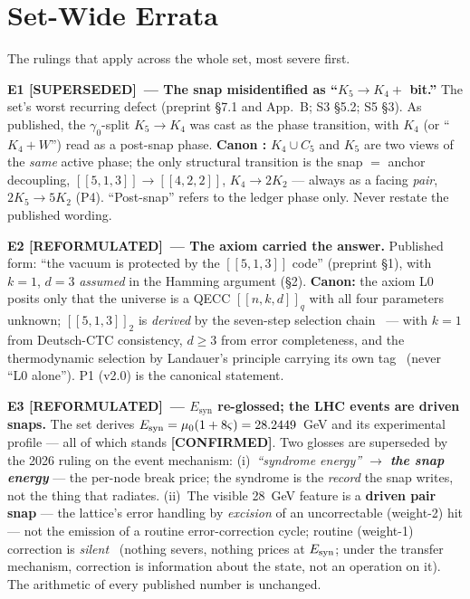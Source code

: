 \documentclass[11pt,a4paper]{article}
\newcommand{\SUP}{\textcolor{Ecolor}{\textbf{[SUPERSEDED]}}}     %
\newcommand{\REF}{\textcolor{Icolor}{\textbf{[REFORMULATED]}}}   %
\newcommand{\OK}{\textcolor{Rcolor}{\textbf{[CONFIRMED]}}}       %
\begin{document}
\newpage

\section{Set-Wide Errata}

The rulings that apply across the whole set, most severe first.

\begin{mdframed}[backgroundcolor=Ebg,linecolor=Ecolor,linewidth=1.2pt]
\textbf{E1 \SUP\ --- The snap misidentified as ``$K_5 \to K_4 + $ bit.''} The set's worst recurring defect (preprint \S7.1 and App.~B; S3 \S5.2; S5 \S3). As published, the $\gamma_0$-split $K_5 \to K_4$ was cast as the phase transition, with $K_4$ (or ``$K_4 + W$'') read as a post-snap phase. \textbf{Canon \Rmark:} $K_4\cup C_5$ and $K_5$ are two views of the \emph{same} active phase; the only structural transition is the snap $=$ anchor decoupling, $[\![5,1,3]\!] \to [\![4,2,2]\!]$, $K_4 \to 2K_2$ --- always as a facing \emph{pair}, $2K_5 \to 5K_2$ (P4). ``Post-snap'' refers to the ledger phase only. Never restate the published wording.
\end{mdframed}

\begin{mdframed}[backgroundcolor=Ibg,linecolor=Icolor,linewidth=1.2pt]
\textbf{E2 \REF\ --- The axiom carried the answer.} Published form: ``the vacuum is protected by the $[\![5,1,3]\!]$ code'' (preprint \S1), with $k{=}1$, $d{=}3$ \emph{assumed} in the Hamming argument (\S2). \textbf{Canon:} the axiom L0 posits only that the universe is a QECC $[\![n,k,d]\!]_q$ with all four parameters unknown; $[\![5,1,3]\!]_2$ is \emph{derived} by the seven-step selection chain \Rmark\ --- with $k{=}1$ from Deutsch-CTC consistency, $d\ge3$ from error completeness, and the thermodynamic selection by Landauer's principle carrying its own tag \Tmark\ (never ``L0 alone''). P1 (v2.0) is the canonical statement.
\end{mdframed}

\begin{mdframed}[backgroundcolor=Ibg,linecolor=Icolor,linewidth=1.2pt]
\textbf{E3 \REF\ --- $E_{\mathrm{syn}}$ re-glossed; the LHC events are driven snaps.} The set derives $E_{\mathrm{syn}} = \mu_0(1+8\varsigma) = 28.2449$~GeV and its experimental profile --- all of which stands \OK. Two glosses are superseded by the 2026 ruling on the event mechanism: (i)~\emph{``syndrome energy'' $\to$ \textbf{the snap energy}} --- the per-node break price; the syndrome is the \emph{record} the snap writes, not the thing that radiates. (ii)~The visible 28~GeV feature is a \textbf{driven pair snap} --- the lattice's error handling by \emph{excision} of an uncorrectable (weight-2) hit --- not the emission of a routine error-correction cycle; routine (weight-1) correction is \emph{silent} \Rmark\ (nothing severs, nothing prices at $E_{\mathrm{syn}}$; under the transfer mechanism, correction is information about the state, not an operation on it). The arithmetic of every published number is unchanged.
\end{mdframed}
\end{document}
